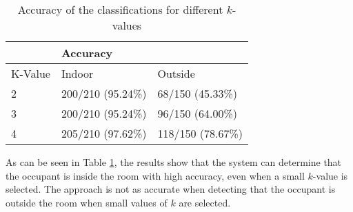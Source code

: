 \begin{table}[H]
    \centering
    \begin{tabular}{|l|ll|}
    \hline
            & \multicolumn{2}{l|}{Accuracy}                      \\ \hline
    K-Value & \multicolumn{1}{l|}{Indoor}          & Outside      \\ \hline
    2       & \multicolumn{1}{l|}{200/210 (95.24\%)} & 68/150 (45.33\%) \\ \hline
    3       & \multicolumn{1}{l|}{200/210 (95.24\%)} & 96/150 (64.00\%) \\ \hline
    4       & \multicolumn{1}{l|}{205/210 (97.62\%)} & 118/150 (78.67\%) \\ \hline   
    \end{tabular}
    \caption{Accuracy of the classifications for different $k$-values}
    \label{lst:resultsPhone_precision}
\end{table}
As can be seen in Table \ref{lst:resultsPhone_precision}, the results show that the system can determine that the occupant is inside the room with high accuracy, even when a small $k$-value is selected. The approach is not as accurate when detecting that the occupant is outside the room when small values of $k$ are selected.  
